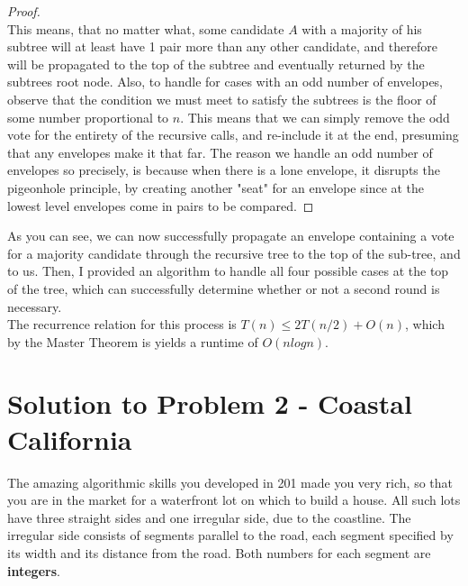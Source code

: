 \documentclass[11pt]{article}
\begin{document}
\begin{proof}
\\
This means, that no matter what, some candidate $A$ with a majority of his subtree will at least have 1 pair more than any other candidate, and therefore will be propagated to the top of the subtree and eventually returned by the subtrees root node. Also, to handle for cases with an odd number of envelopes, observe that the condition we must meet to satisfy the subtrees is the floor of some number proportional to $n$. This means that we can simply remove the odd vote for the entirety of the recursive calls, and re-include it at the end, presuming that any envelopes make it that far. The reason we handle an odd number of envelopes so precisely, is because when there is a lone envelope, it disrupts the pigeonhole principle, by creating another "seat" for an envelope since at the lowest level envelopes come in pairs to be compared.
\end{proof}

As you can see, we can now successfully propagate an envelope containing a vote for a majority candidate through the recursive tree to the top of the sub-tree, and to us. Then, I provided an algorithm to handle all four possible cases at the top of the tree, which can successfully determine whether or not a second round is necessary.\\
\linebreak
The recurrence relation for this process is $T(n) \leq 2T(n/2) + O(n)$, which by the Master Theorem is yields a runtime of $O(nlogn)$.

\newpage

\section*{Solution to Problem 2 - Coastal California}

The amazing algorithmic skills you developed in 201 made you very rich, so that you are in the market for a waterfront lot on which to build a house. All such lots have three straight sides and one irregular side, due to the coastline. The irregular side consists of segments parallel to the road, each segment specified by its width and its distance from the road. Both numbers for each segment are \textbf{integers}.
\end{document}
